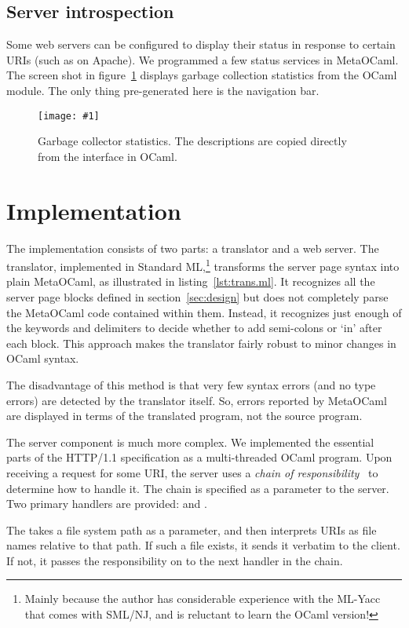 \documentclass[preprint]{acm_proc_article-sp}
\def\MOC{MetaOCaml\xspace}
\newcommand{\myfig}[3]{%
  \begin{figure}[tbp]%
    #3%
    \caption{#2}%
    \label{fig:#1}%
  \end{figure}}
\newcommand{\screenshot}[2]{%
  \myfig{#1}{#2}
  {\centering%
    \texttt{[image: \#1]}}}
\newcounter{listing}
\begin{document}
\subsection{Server introspection}

Some web servers can be configured to display their status in response
to certain URIs (such as  on Apache).  We
programmed a few status services in \MOC.  The screen shot in
figure~\ref{fig:gc} displays garbage collection statistics from the
OCaml  module.  The only thing pre-generated here is the
navigation bar.

\screenshot{gc}{Garbage collector statistics.  The descriptions are
  copied directly from the \id{gc.mli} interface in OCaml.}


\section{Implementation}
\label{sec:impl}

The implementation consists of two parts: a translator and a web
server.  The translator, implemented in Standard ML,\footnote{Mainly
  because the author has considerable experience with the ML-Yacc that
  comes with SML/NJ, and is reluctant to learn the OCaml version!}
transforms the server page syntax into plain \MOC, as illustrated in
listing~\ref{lst:trans.ml}.  It recognizes all the server page blocks
defined in section~\ref{sec:design} but does not completely parse the
\MOC code contained within them.  Instead, it recognizes just enough
of the keywords and delimiters to decide whether to add semi-colons or
`{\KWfont in}' after each block.  This approach makes the translator
fairly robust to minor changes in OCaml syntax.

The disadvantage of this method is that very few syntax errors (and
no type errors) are detected by the translator itself.  So, errors
reported by \MOC are displayed in terms of the translated program, not
the source program.

The server component is much more complex.  We implemented the
essential parts of the HTTP/1.1 specification as a multi-threaded
OCaml program.  Upon receiving a request for some URI, the server uses
a \emph{chain of responsibility}~\cite{gamma95design} to determine
how to handle it.  The chain is specified as a parameter to the
server.  Two primary handlers are provided:  and
.

The  takes a file system path as a parameter, and then
interprets URIs as file names relative to that path.  If such a file
exists, it sends it verbatim to the client.  If not, it passes
the responsibility on to the next handler in the chain.
\end{document}
